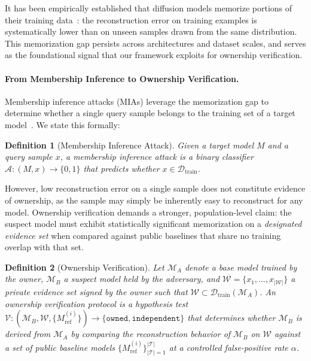\documentclass{article}
\newtheorem{definition}{Definition}
\begin{document}
It has been empirically established that diffusion models memorize 
portions of their training data~\cite{carlini2023extracting, 
somepalli2023diffusion}: the reconstruction error on training 
examples is systematically lower than on unseen samples drawn from 
the same distribution. This memorization gap persists across 
architectures and dataset scales, and serves as the foundational 
signal that our framework exploits for ownership verification.

\paragraph{From Membership Inference to Ownership Verification.}
Membership inference attacks (MIAs) leverage the memorization gap 
to determine whether a single query sample belongs to the training 
set of a target model~\cite{duan2023diffusion, kong2024efficient}. 
We state this formally:

\begin{definition}[Membership Inference Attack]
Given a target model $M$ and a query sample $x$, a 
membership inference attack is a binary classifier 
$\mathcal{A}: (M, x) \rightarrow \{0, 1\}$ that predicts 
whether $x \in \mathcal{D}_{\mathrm{train}}$.
\end{definition}

However, low reconstruction error on a single sample does not constitute evidence of ownership, as the sample may simply be inherently easy to reconstruct for any model. Ownership 
verification demands a stronger, population-level claim: the 
suspect model must exhibit statistically significant memorization 
on a \emph{designated evidence set} when compared against public 
baselines that share no training overlap with that set.

\begin{definition}[Ownership Verification]
Let $\mathcal{M}_A$ denote a base model trained by the 
owner, $\mathcal{M}_B$ a suspect model held by the 
adversary, and $\mathcal{W} = \{x_1, \dots, x_{|\mathcal{W}|}\}$ a private 
evidence set signed by the owner such that 
$\mathcal{W} \subset \mathcal{D}_{\mathrm{train}}
(\mathcal{M}_A)$. An ownership verification protocol is 
a hypothesis test 
$\mathcal{V}: (\mathcal{M}_B, \mathcal{W}, 
\{M_{\text{ref}}^{(i)}\}) \rightarrow 
\{\texttt{owned}, \texttt{independent}\}$ 
that determines whether $\mathcal{M}_B$ is derived from 
$\mathcal{M}_A$ by comparing the reconstruction behavior 
of $\mathcal{M}_B$ on $\mathcal{W}$ against a set of 
public baseline models 
$\{M_{\text{ref}}^{(i)}\}_{|\mathcal{T}|=1}^{|\mathcal{T}|}$ at a controlled 
false-positive rate $\alpha$.
\end{definition}
\end{document}
